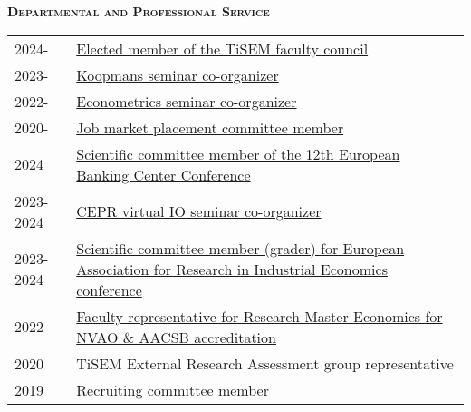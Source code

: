\documentclass[11pt,overlapped,line,letterpaper]{article}
\newcommand{\cvsec}[1]{\vspace{\baselineskip}\textbf{\textsc{#1}}}
\begin{document}



\cvsec{Departmental and Professional Service}\smallskip \\
\begin{tabularx}{\textwidth}{lX}
  2024- & \href{https://www.tilburguniversity.edu/about/schools/economics-and-management/organization}{Elected member of the TiSEM faculty council}\\
  2023- & \href{https://www.tilburguniversity.edu/about/schools/economics-and-management/news-and-events/seminars/koopmans-seminar}{Koopmans seminar co-organizer} \\
  2022- & \href{https://www.tilburguniversity.edu/about/schools/economics-and-management/news-and-events/seminars/econometrics-and-statistics}{Econometrics seminar co-organizer} \\
  2020- & \href{https://sites.google.com/view/jobmarketplacementtilburg}{Job market placement committee member} \\
2024 & \href{https://cepr.org/events/12th-european-banking-center-conference-2nd-tilburg-finance-summit}{Scientific committee member of the 12th European Banking Center Conference}\\%
  2023-2024 & \href{https://cepr.org/events/event-series/cepr-virtual-io-seminar}{CEPR virtual IO seminar co-organizer} \\
  2023-2024 & \href{https://earie.org/}{Scientific committee member (grader) for European Association for Research in Industrial Economics conference} \\
  2022 & \href{https://www.tilburguniversity.edu/current/news/more-news/renewed-nvao-and-aacsb-accreditation-all-programs-tilburg-school-economics-and-management}{Faculty representative for Research Master Economics for NVAO \& AACSB accreditation}  \\
  2020 & TiSEM External Research Assessment group representative \\
  2019 & Recruiting committee member \\
\end{tabularx}
\end{document}
